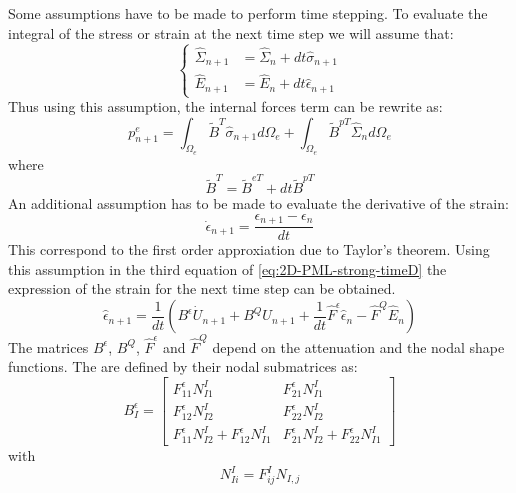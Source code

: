 Some assumptions have to be made to perform time stepping. To evaluate the integral of the stress or strain at the next time step we will assume that:
\begin{equation}
\begin{cases}
\hat{\Sigma}_{n+1} &= \hat{\Sigma}_n + dt \hat{\sigma}_{n+1} \\
\hat{E}_{n+1} &= \hat{E}_n + dt \hat{\epsilon}_{n+1}
\end{cases}
\end{equation}
Thus using this assumption, the internal forces term can be rewrite as:
\begin{equation}
p_{n+1}^e = \int_{\Omega_e} \tilde{B}^{T} \hat{\sigma}_{n+1} d\Omega_e + \int_{\Omega_e}\tilde{B}^{pT} \hat{\Sigma}_{n} d\Omega_e
\end{equation}
where
\begin{equation}
\tilde{B}^{T} = \tilde{B}^{eT} + dt \tilde{B}^{pT}
\end{equation}
An additional assumption has to be made to evaluate the derivative of the strain:
\begin{equation}
\dot{\epsilon}_{n+1} = \frac{\epsilon_{n+1}-\epsilon_n}{dt}
\end{equation} 
This correspond to the first order approxiation due to Taylor's theorem.
Using this assumption in the third equation of \ref{eq:2D-PML-strong-timeD} the expression of the strain for the next time step can be obtained.
\begin{equation}
\hat{\epsilon}_{n+1} = \frac{1}{dt}\left(B^\epsilon \dot{U}_{n+1} + B^Q U_{n+1} + \frac{1}{dt} \hat{F}^\epsilon \hat{\epsilon}_n - \hat{F}^Q \hat{E}_n\right)
\label{eq:strain-n+1}
\end{equation} 
The matrices $B^\epsilon$, $B^Q$, $\hat{F}^\epsilon$ and $\hat{F}^Q$ depend on the attenuation and the nodal shape functions. The are defined by their nodal submatrices as:
\begin{equation}
B^\epsilon_I = \begin{bmatrix}
F^\epsilon_{11}N^I_{I1}&F^\epsilon_{21}N^I_{I1}\\
F^\epsilon_{12}N^I_{I2}&F^\epsilon_{22}N^I_{I2}\\
F^\epsilon_{11}N^I_{I2}+F^\epsilon_{12}N^I_{I1}& F^\epsilon_{21}N^I_{I2}+F^\epsilon_{22}N^I_{I1}
\end{bmatrix}
\end{equation}
with
\begin{equation}
N^I_{Ii} = F^I_{ij}N_{I,j}
\end{equation}
